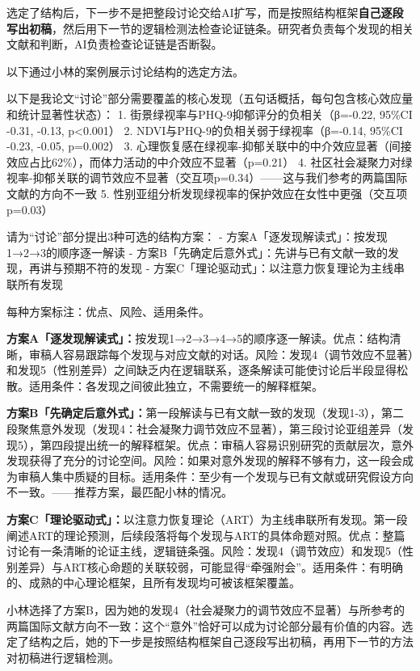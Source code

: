 选定了结构后，下一步不是把整段讨论交给AI扩写，而是按照结构框架\textbf{自己逐段写出初稿}，然后用下一节的逻辑检测法检查论证链条。研究者负责每个发现的相关文献和判断，AI负责检查论证链是否断裂。

以下通过小林的案例展示讨论结构的选定方法。

\begin{userbox}
以下是我论文``讨论''部分需要覆盖的核心发现（五句话概括，每句包含核心效应量和统计显著性状态）：
1. 街景绿视率与PHQ-9抑郁评分的负相关（β=-0.22, 95\%CI -0.31, -0.13, p<0.001）
2. NDVI与PHQ-9的负相关弱于绿视率（β=-0.14, 95\%CI -0.23, -0.05, p=0.002）
3. 心理恢复感在绿视率-抑郁关联中的中介效应显著（间接效应占比62\%），而体力活动的中介效应不显著（p=0.21）
4. 社区社会凝聚力对绿视率-抑郁关联的调节效应不显著（交互项p=0.34）——这与我们参考的两篇国际文献的方向不一致
5. 性别亚组分析发现绿视率的保护效应在女性中更强（交互项p=0.03）

请为``讨论''部分提出3种可选的结构方案：
- 方案A「逐发现解读式」：按发现1→2→3的顺序逐一解读
- 方案B「先确定后意外式」：先讲与已有文献一致的发现，再讲与预期不符的发现
- 方案C「理论驱动式」：以注意力恢复理论为主线串联所有发现

每种方案标注：优点、风险、适用条件。
\end{userbox}

\begin{aibox}
\textbf{方案A「逐发现解读式」：}按发现1→2→3→4→5的顺序逐一解读。优点：结构清晰，审稿人容易跟踪每个发现与对应文献的对话。风险：发现4（调节效应不显著）和发现5（性别差异）之间缺乏内在逻辑联系，逐条解读可能使讨论后半段显得松散。适用条件：各发现之间彼此独立，不需要统一的解释框架。

\textbf{方案B「先确定后意外式」：}第一段解读与已有文献一致的发现（发现1-3），第二段聚焦意外发现（发现4：社会凝聚力调节效应不显著），第三段讨论亚组差异（发现5），第四段提出统一的解释框架。优点：审稿人容易识别研究的贡献层次，意外发现获得了充分的讨论空间。风险：如果对意外发现的解释不够有力，这一段会成为审稿人集中质疑的目标。适用条件：至少有一个发现与已有文献或研究假设方向不一致。——推荐方案，最匹配小林的情况。

\textbf{方案C「理论驱动式」：}以注意力恢复理论（ART）为主线串联所有发现。第一段阐述ART的理论预测，后续段落将每个发现与ART的具体命题对照。优点：整篇讨论有一条清晰的论证主线，逻辑链条强。风险：发现4（调节效应）和发现5（性别差异）与ART核心命题的关联较弱，可能显得``牵强附会''。适用条件：有明确的、成熟的中心理论框架，且所有发现均可被该框架覆盖。
\end{aibox}

\begin{critiquebox}
小林选择了方案B，因为她的发现4（社会凝聚力的调节效应不显著）与所参考的两篇国际文献方向不一致：这个``意外''恰好可以成为讨论部分最有价值的内容。选定了结构之后，她的下一步是按照结构框架自己逐段写出初稿，再用下一节的方法对初稿进行逻辑检测。
\end{critiquebox}

